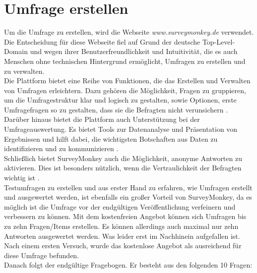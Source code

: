 \section{Umfrage erstellen}
Um die Umfrage zu erstellen, wird die Webseite \emph{www.surveymonkey.de} verwendet. Die Entscheidung für diese Webseite fiel auf Grund der deutsche Top-Level-Domain und wegen ihrer Benutzerfreundlichkeit und Intuitivität, die es auch Menschen ohne technischen Hintergrund ermöglicht, Umfragen zu erstellen und zu verwalten\cite{surveymonkey-create-surveys}.\\
Die Plattform bietet eine Reihe von Funktionen, die das Erstellen und Verwalten von Umfragen erleichtern. Dazu gehören die Möglichkeit, Fragen zu gruppieren, um die Umfragestruktur klar und logisch zu gestalten, sowie Optionen, erste Umfragefragen so zu gestalten, dass sie die Befragten nicht verunsichern \cite{surveymonkey-create-surveys}.\\
Darüber hinaus bietet die Plattform auch Unterstützung bei der Umfrageauswertung. Es bietet Tools zur Datenanalyse und  Präsentation von Ergebnissen und hilft dabei, die wichtigsten Botschaften aus  Daten zu identifizieren und zu kommunizieren \cite{surveymonkey-auswertung-einer-umfrage}. \\
Schließlich bietet SurveyMonkey auch die Möglichkeit, anonyme Antworten zu aktivieren. Dies ist besonders nützlich, wenn die Vertraulichkeit der Befragten wichtig ist \cite{surveymonkey-anonymous-responses}.\\
Testumfragen zu erstellen und aus erster Hand zu erfahren, wie Umfragen erstellt und ausgewertet werden, ist ebenfalls ein großer Vorteil von SurveyMonkey, da es möglich ist die Umfrage vor der endgültigen Veröffentlichung verfeinern und verbessern zu können. 
Mit dem kostenfreien Angebot können sich Umfragen bis zu zehn Fragen/Items erstellen. Es können allerdings auch maximal nur zehn Antworten ausgewertet werden. Was leider erst im Nachhinein aufgefallen ist.
Nach einem ersten Versuch, wurde das kostenlose Angebot als ausreichend für diese Umfrage befunden.
\\
Danach folgt der endgültige Fragebogen. Er besteht aus den folgenden 10 Fragen:
